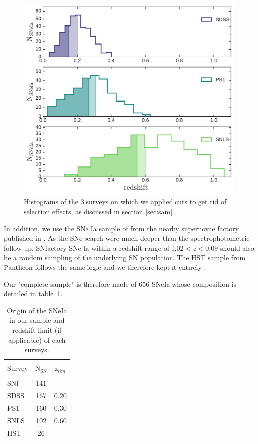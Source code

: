 \documentclass[]{aa} %
\begin{document}
\begin{figure}
    \centering
    \includegraphics[width=\linewidth]{Article_figures/hist_surveys_cuts.pdf}
    \caption{Histograms of the 3 surveys on which we applied cuts to get rid of selection effects, as discussed in section \ref{sec:sam}.}
    \label{fig:cuts}
\end{figure}

In addition, we use the SNe Ia sample of from the nearby supernovae factory
\citep[SNfactory][]{aldering2004} published in \citep{rigault2018}. As the SNe
search were much deeper than the spectrophotometric follow-up, SNfactory SNe Ia
within a redshift range of $0.02<z<0.09$ should also be a random sampling of the
underlying SN population. The HST sample from
Pantheon follows the same logic and we therefore kept it entirely \citep{FIND BACK THE REF}.

Our "complete sample" is therefore made of 656 SNeIa whose composition is
detailed in table~\ref{tab:sample}.

\begin{table}
    \centering
    \caption{Origin of the SNeIa in our sample and redshift limit (if
    applicable) of each surveys.}
    \label{tab:sample}
    \begin{tabular}{l c c}
    \hline\hline\\[-0.8em]
        Survey & N$_{\mathrm{SN}}$  & z$_{lim}$ \\[0.15em]
        \hline\\[-0.8em]
        SNf & 141 & --\\[0.30em]
        SDSS & 167 & 0.20\\[0.30em]
        PS1 & 160 & 0.30 \\[0.30em]        
        SNLS & 102 & 0.60\\[0.30em]
        HST & 26 & --\\[0.30em]
        \hline
    \end{tabular}
\end{table}
\end{document}
